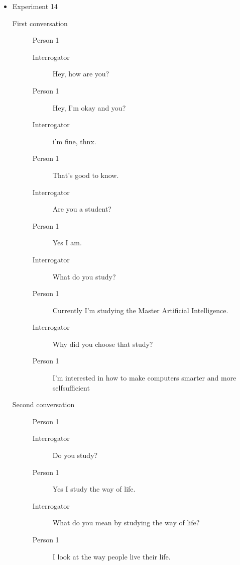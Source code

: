 \begin{itemize}
   \item Experiment 14
      \begin{description}
         \item [First conversation] Person 1
            \begin{description}
               \item [Interrogator] Hey, how are you?
               \item [Person 1] Hey, I'm okay and you?
               \item [Interrogator] i'm fine, thnx.
               \item [Person 1] That's good to know.
               \item [Interrogator] Are you a student?
               \item [Person 1] Yes I am.
               \item [Interrogator] What do you study?
               \item [Person 1] Currently I'm studying the Master Artificial Intelligence.
               \item [Interrogator] Why did you choose that study?
               \item [Person 1] I'm interested in how to make computers smarter and more selfsufficient
            \end{description}
         \item [Second conversation] Person 1
            \begin{description}
               \item [Interrogator] Do you study?
               \item [Person 1] Yes I study the way of life.
               \item [Interrogator] What do you mean by studying the way of life?
               \item [Person 1] I look at the way people live their life.
            \end{description}
      \end{description}


\end{itemize}
